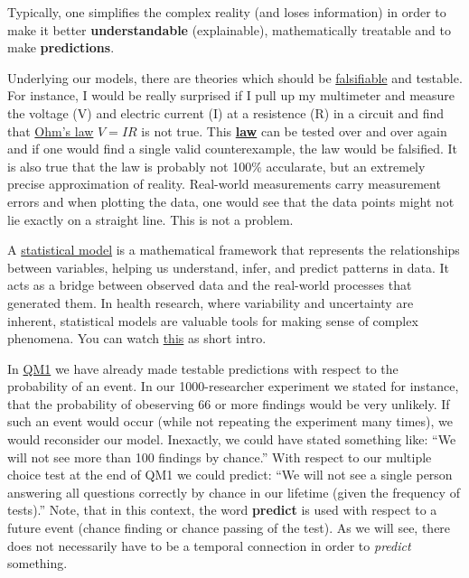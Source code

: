 \documentclass[
]{book}
\begin{document}
Typically, one simplifies the complex reality (and loses information)
in order to make it better
\textbf{understandable} (explainable), mathematically treatable and to make \textbf{predictions}.

Underlying our models, there are theories which should be \href{https://en.wikipedia.org/wiki/Falsifiability}{falsifiable}
and testable.
For instance, I would be really surprised if I pull up my multimeter and measure the voltage (V) and
electric current (I) at a resistence (R) in a circuit and find that \href{https://en.wikipedia.org/wiki/Ohm\%27s_law}{Ohm's law} \(V = IR\) is not true.
This \href{https://en.wikipedia.org/wiki/Scientific_law}{\textbf{law}}
can be tested over and over again and if one would find a single valid counterexample,
the law would be falsified. It is also true that the law is probably not 100\% accularate,
but an extremely precise approximation of reality. Real-world measurements carry
measurement errors and when plotting the data, one would see that the data points
might not lie exactly on a straight line. This is not a problem.

A \href{https://en.wikipedia.org/wiki/Statistical_model}{statistical model}
is a mathematical framework that represents the
relationships between variables, helping us understand, infer, and
predict patterns in data. It acts as a bridge between observed data
and the real-world processes that generated them. In health research,
where variability and uncertainty are inherent, statistical models are
valuable tools for making sense of complex phenomena.
You can watch \href{https://www.youtube.com/watch?v=3d5ivs_8amQ&ab_channel=VeryNormal}{this} as short intro.

In \href{https://jdegenfellner.github.io/Script_QM1_ZHAW/probs.html}{QM1} we have already
made testable predictions with respect to the probability of an event.
In our 1000-researcher experiment we stated for instance, that the probability of
obeserving \(66\) or more findings would be very unlikely. If such an event would
occur (while not repeating the experiment many times), we would reconsider our model.
Inexactly, we could have stated something like: ``We will not see more than 100 findings by chance.''
With respect to our multiple choice test at the end of QM1 we could predict:
``We will not see a single person answering all questions correctly by chance in our
lifetime (given the frequency of tests).'' Note, that in this context, the word \textbf{predict}
is used with respect to a future event (chance finding or chance passing of the test).
As we will see, there does not necessarily have to be a temporal connection in order
to \emph{predict} something.
\end{document}
